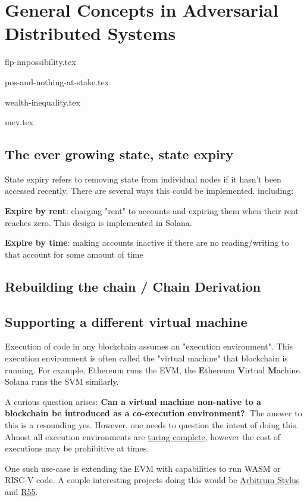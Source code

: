 \chapter{General Concepts in Adversarial Distributed Systems}

{flp-impossibility.tex}

{pos-and-nothing-at-stake.tex}

{wealth-inequality.tex}

{mev.tex}

\section{The ever growing state, state expiry}
State expiry refers to removing state from individual nodes if it hasn't been accessed recently. There are several ways this could be implemented, including:

\textbf{Expire by rent}: charging "rent" to accounts and expiring them when their rent reaches zero. This design is implemented in Solana.

\textbf{Expire by time}: making accounts inactive if there are no reading/writing to that account for some amount of time


\section{Rebuilding the chain / Chain Derivation}

\section{Supporting a different virtual machine}
Execution of code in any blockchain assumes an "execution environment". This execution environment is often called the "virtual machine" that blockchain is running. For example, Ethereum runs the EVM, the \textbf{E}thereum \textbf{V}irtual \textbf{M}achine. Solana runs the SVM similarly.

A curious question arises: \textbf{Can a virtual machine non-native to a blockchain be introduced as a co-execution environment?}. The answer to this is a resounding yes. However, one needs to question the intent of doing this. Almost all execution environments are \href{https://www.bitstamp.net/learn/blockchain/what-is-turing-complete/}{turing complete}, however the cost of executions may be prohibitive at times.

One such use-case is extending the EVM with capabilities to run WASM or RISC-V code. A couple interesting projects doing this would be \href{https://arbitrum.io/stylus}{Arbitrum Stylus} and \href{https://hackmd.io/@leoalt/r55}{R55}.

